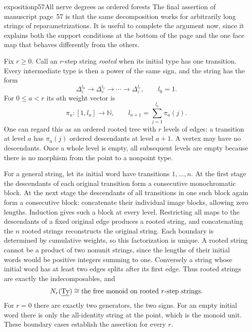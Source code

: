 \begin{dcomment}{exposition}{p57}{All nerve degrees as ordered forests}
The final assertion of manuscript page~57 is that the same decomposition works for arbitrarily long strings of reparametrizations. It is useful to complete the argument now, since it explains both the support conditions at the bottom of the page and the one face map that behaves differently from the others.

Fix $r\geq0$. Call an $r$-step string \emph{rooted} when its initial type has one transition. Every intermediate type is then a power of the same sign, and the string has the form
\[
 \Delta_\varepsilon^{l_0}\longrightarrow
 \Delta_\varepsilon^{l_1}\longrightarrow\cdots\longrightarrow
 \Delta_\varepsilon^{l_r},\qquad l_0=1.
\]
For $0\leq a<r$ its $a$th weight vector is
\[
 \pi_a:[1,l_a]\longrightarrow\mathbb N,
 \qquad l_{a+1}=\sum_{j=1}^{l_a}\pi_a(j).
\]
One can regard this as an ordered rooted tree with $r$ levels of edges: a transition at level $a$ has $\pi_a(j)$ ordered descendants at level $a+1$. A vertex may have no descendants. Once a whole level is empty, all subsequent levels are empty because there is no morphism from the point to a nonpoint type.

For a general string, let its initial word have transitions $1,\ldots,n$. At the first stage the descendants of each original transition form a consecutive monochromatic block. At the next stage the descendants of all transitions in one such block again form a consecutive block: concatenate their individual image blocks, allowing zero lengths. Induction gives such a block at every level. Restricting all maps to the descendants of a fixed original edge produces a rooted string, and concatenating the $n$ rooted strings reconstructs the original string. Each boundary is determined by cumulative weights, so this factorization is unique. A rooted string cannot be a product of two nonunit strings, since the lengths of their initial words would be positive integers summing to one. Conversely a string whose initial word has at least two edges splits after its first edge. Thus rooted strings are exactly the indecomposables, and
\[
 N_r(\underline{\mathrm{Ty}})\cong\text{the free monoid on rooted $r$-step strings}.
\]
For $r=0$ there are exactly two generators, the two signs. For an empty initial word there is only the all-identity string at the point, which is the monoid unit. These boundary cases establish the assertion for every $r$.


\end{dcomment}
